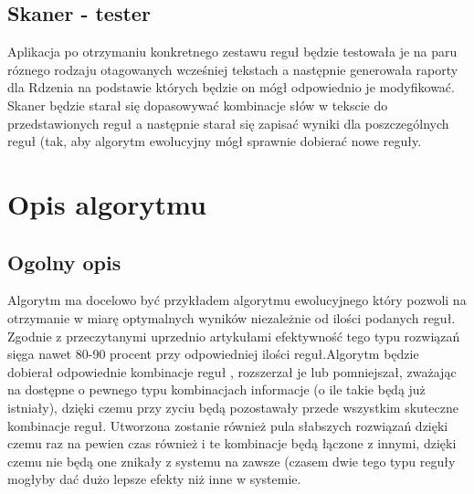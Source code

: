 \documentclass[12pt]{article}
\begin{document}
\subsection{Skaner - tester}
Aplikacja po otrzymaniu konkretnego zestawu reguł będzie testowała je na paru róznego rodzaju otagowanych wcześniej tekstach a następnie generowała raporty dla Rdzenia na podstawie których będzie on mógł odpowiednio je modyfikować.
Skaner będzie starał się dopasowywać kombinacje słów w tekscie do przedstawionych reguł a następnie starał się zapisać wyniki dla poszczególnych reguł (tak, aby algorytm ewolucyjny mógł sprawnie dobierać nowe reguły.
\section{Opis algorytmu}
\subsection{Ogolny opis}
Algorytm ma docelowo być przykładem algorytmu ewolucyjnego który pozwoli na otrzymanie w miarę optymalnych wyników niezależnie od ilości podanych reguł.  Zgodnie z przeczytanymi uprzednio artykułami efektywność tego typu rozwiązań sięga nawet 80-90 procent przy odpowiedniej ilości reguł.Algorytm będzie dobierał odpowiednie kombinacje reguł , rozszerzał je lub pomniejszał, zważając na dostępne o pewnego typu kombinacjach informacje (o ile takie będą już istniały), dzięki czemu przy zyciu będą pozostawały przede wszystkim skuteczne kombinacje reguł. Utworzona zostanie również pula słabszych rozwiązań dzięki czemu raz na pewien czas również i te kombinacje będą łączone z innymi, dzięki czemu nie będą one znikały z systemu na zawsze (czasem dwie tego typu reguły mogłyby dać dużo lepsze efekty niż inne w systemie.
\end{document}
